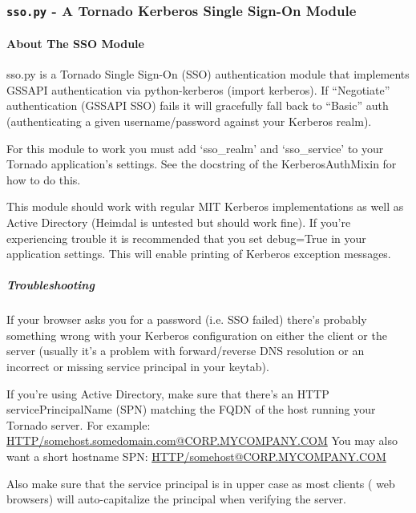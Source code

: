 \documentclass[letterpaper,10pt,openany]{sphinxmanual}
\begin{document}
\subsubsection{\texttt{sso.py} - A Tornado Kerberos Single Sign-On Module}
\label{Developer/sso:sso-py-a-tornado-kerberos-single-sign-on-module}\label{Developer/sso:module-gateone.auth.sso}\label{Developer/sso::doc}

\paragraph{About The SSO Module}
\label{Developer/sso:sso-py}\label{Developer/sso:about-the-sso-module}
sso.py is a Tornado Single Sign-On (SSO) authentication module that implements
GSSAPI authentication via python-kerberos (import kerberos).  If ``Negotiate''
authentication (GSSAPI SSO) fails it will gracefully fall back to ``Basic'' auth
(authenticating a given username/password against your Kerberos realm).

For this module to work you must add `sso\_realm' and `sso\_service' to your
Tornado application's settings.  See the docstring of the KerberosAuthMixin for
how to do this.

This module should work with regular MIT Kerberos implementations as well as
Active Directory (Heimdal is untested but should work fine).  If you're
experiencing trouble it is recommended that you set debug=True in your
application settings.  This will enable printing of Kerberos exception messages.


\subparagraph{Troubleshooting}
\label{Developer/sso:troubleshooting}
If your browser asks you for a password (i.e. SSO failed) there's probably
something wrong with your Kerberos configuration on either the client or the
server (usually it's a problem with forward/reverse DNS resolution or an
incorrect or missing service principal in your keytab).

If you're using Active Directory, make sure that there's an HTTP
servicePrincipalName (SPN) matching the FQDN of the host running your Tornado
server.  For example:  \href{mailto:HTTP/somehost.somedomain.com@CORP.MYCOMPANY.COM}{HTTP/somehost.somedomain.com@CORP.MYCOMPANY.COM}
You may also want a short hostname SPN: \href{mailto:HTTP/somehost@CORP.MYCOMPANY.COM}{HTTP/somehost@CORP.MYCOMPANY.COM}

Also make sure that the service principal is in upper case as most clients (
web browsers) will auto-capitalize the principal when verifying the server.
\end{document}
